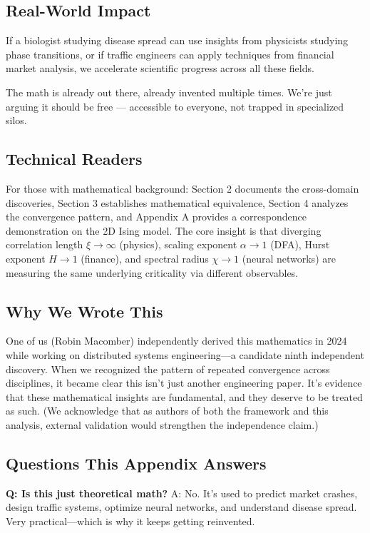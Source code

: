 \documentclass[11pt]{article}
\begin{document}
\subsection*{Real-World Impact}

If a biologist studying disease spread can use insights from physicists studying phase transitions, or if traffic engineers can apply techniques from financial market analysis, we accelerate scientific progress across all these fields.

The math is already out there, already invented multiple times. We're just arguing it should be free --- accessible to everyone, not trapped in specialized silos.

\subsection*{Technical Readers}

For those with mathematical background: Section 2 documents the cross-domain discoveries, Section 3 establishes mathematical equivalence, Section 4 analyzes the convergence pattern, and Appendix A provides a correspondence demonstration on the 2D Ising model. The core insight is that diverging correlation length $\xi \to \infty$ (physics), scaling exponent $\alpha \to 1$ (DFA), Hurst exponent $H \to 1$ (finance), and spectral radius $\chi \to 1$ (neural networks) are measuring the same underlying criticality via different observables.

\subsection*{Why We Wrote This}

One of us (Robin Macomber) independently derived this mathematics in 2024 while working on distributed systems engineering---a candidate ninth independent discovery. When we recognized the pattern of repeated convergence across disciplines, it became clear this isn't just another engineering paper. It's evidence that these mathematical insights are fundamental, and they deserve to be treated as such. (We acknowledge that as authors of both the framework and this analysis, external validation would strengthen the independence claim.)

\subsection*{Questions This Appendix Answers}

\textbf{Q: Is this just theoretical math?}
A: No. It's used to predict market crashes, design traffic systems, optimize neural networks, and understand disease spread. Very practical---which is why it keeps getting reinvented.
\end{document}

